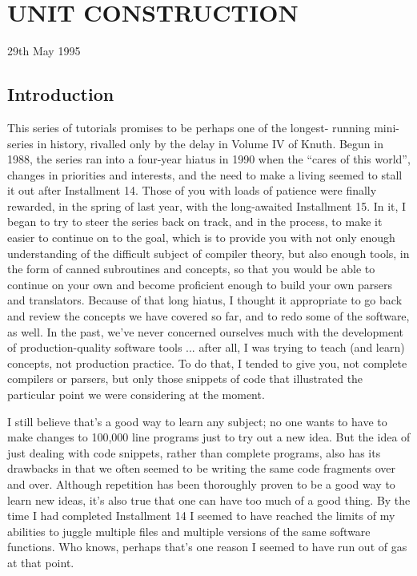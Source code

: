 
\chapter{UNIT CONSTRUCTION}

29th May 1995

\section{Introduction}

This series of tutorials promises to be perhaps one of the longest- running mini-series in history, rivalled only by the delay in Volume IV of Knuth. Begun in 1988, the series ran into a four-year hiatus in 1990 when the ``cares of this world'', changes in priorities and interests, and the need to make a living seemed to stall it out after Installment 14. Those of you with loads of patience were finally rewarded, in the spring of last year, with the long-awaited Installment 15. In it, I began to try to steer the series back on track, and in the process, to make it easier to continue on to the goal, which is to provide you with not only enough understanding of the difficult subject of compiler theory, but also enough tools, in the form of canned subroutines and concepts, so that you would be able to continue on your own and become proficient enough to build your own parsers and translators. Because of that long hiatus, I thought it appropriate to go back and review the concepts we have covered so far, and to redo some of the software, as well. In the past, we've never concerned ourselves much with the development of production-quality software tools ... after all, I was trying to teach (and learn) concepts, not production practice. To do that, I tended to give you, not complete compilers or parsers, but only those snippets of code that illustrated the particular point we were considering at the moment.

I still believe that's a good way to learn any subject; no one wants to have to make changes to 100,000 line programs just to try out a new idea. But the idea of just dealing with code snippets, rather than complete programs, also has its drawbacks in that we often seemed to be writing the same code fragments over and over. Although repetition has been thoroughly proven to be a good way to learn new ideas, it's also true that one can have too much of a good thing. By the time I had completed Installment 14 I seemed to have reached the limits of my abilities to juggle multiple files and multiple versions of the same software functions. Who knows, perhaps that's one reason I seemed to have run out of gas at that point.

